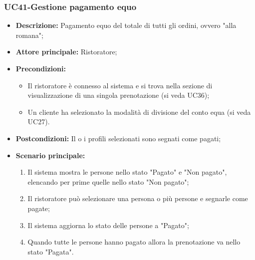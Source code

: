 \subsubsection{UC41-Gestione pagamento equo}
\begin{itemize}
    \item \textbf{Descrizione:} Pagamento equo del totale di tutti gli ordini, ovvero "alla romana";
    \item \textbf{Attore principale:} Ristoratore;
    \item \textbf{Precondizioni:}
    \begin{itemize}
        \item Il ristoratore è connesso al sistema e si trova nella sezione di visualizzazione di una singola prenotazione (si veda UC36);
        \item Un cliente ha selezionato la modalità di divisione del conto equa (si veda UC27).
    \end{itemize}
    \item \textbf{Postcondizioni:} Il o i profili selezionati sono segnati come pagati;
    \item \textbf{Scenario principale:}
    \begin{enumerate}
        \item Il sistema mostra le persone nello stato "Pagato" e "Non pagato", elencando per prime quelle nello stato "Non pagato";
        \item Il ristoratore può selezionare una persona o più persone e segnarle come pagate;
        \item Il sistema aggiorna lo stato delle persone a "Pagato";
        \item Quando tutte le persone hanno pagato allora la prenotazione va nello stato "Pagata".
    \end{enumerate}
\end{itemize}

